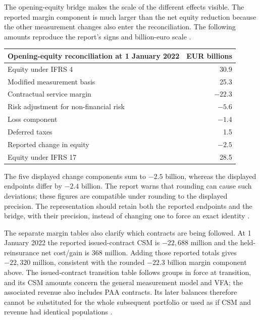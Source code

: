 The opening-equity bridge makes the scale of the different effects visible.
The reported margin component is much larger than the net equity reduction
because the other measurement changes also enter the reconciliation. The
following amounts reproduce the report's signs and billion-euro scale
\citep[p.~184]{munichre2023annual}.

\begin{center}
\begin{tabular}{lr}
\toprule
Opening-equity reconciliation at 1 January 2022 & EUR billions \\
\midrule
Equity under IFRS 4 & 30.9 \\
Modified measurement basis & 25.3 \\
Contractual service margin & $-22.3$ \\
Risk adjustment for non-financial risk & $-5.6$ \\
Loss component & $-1.4$ \\
Deferred taxes & 1.5 \\
Reported change in equity & $-2.5$ \\
Equity under IFRS 17 & 28.5 \\
\bottomrule
\end{tabular}
\end{center}

The five displayed change components sum to $-2.5$ billion, whereas the
displayed endpoints differ by $-2.4$ billion. The report warns that rounding
can cause such deviations; these figures are compatible under rounding to
the displayed precision. The representation should retain both the reported
endpoints and the bridge, with their precision, instead of changing one to
force an exact identity \citep[pp.~1, 155 and 184]{munichre2023annual}.

\clearpage
The separate margin tables also clarify which contracts are being followed.
At 1 January 2022 the reported issued-contract CSM is $-22{,}688$ million
and the held-reinsurance net cost/gain is $368$ million. Adding those reported
totals gives $-22{,}320$ million, consistent with the rounded $-22.3$ billion
margin component above. The issued-contract transition table follows groups
in force at transition, and its CSM amounts concern the general measurement
model and VFA; the associated revenue also includes PAA contracts. Its
later balances therefore cannot be substituted for the whole subsequent
portfolio or used as if CSM and revenue had identical populations
\citep[pp.~210--211 and 254--255]{munichre2023annual}.


